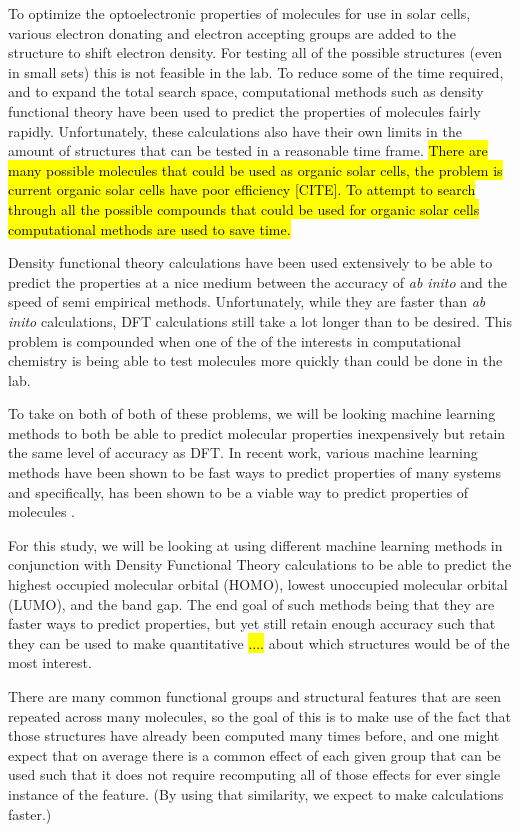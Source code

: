 \documentclass[10pt]{article}
\begin{document}
To optimize the optoelectronic properties of molecules for use in solar cells, various electron donating and electron accepting groups are added to the structure to shift electron density. For testing all of the possible structures (even in small sets) this is not feasible in the lab. To reduce some of the time required, and to expand the total search space, computational methods such as density functional theory have been used to predict the properties of molecules fairly rapidly. Unfortunately, these calculations also have their own limits in the amount of structures that can be tested in a reasonable time frame.
 \hl{There are many possible molecules that could be used as organic solar cells, the problem is current organic solar cells have poor efficiency [CITE]. To attempt to search through all the possible compounds that could be used for organic solar cells computational methods are used to save time.}

Density functional theory calculations have been used extensively to be able to predict the properties at a nice medium between the accuracy of \emph{ab inito} and the speed of semi empirical methods. Unfortunately, while they are faster than \emph{ab inito} calculations, DFT calculations still take a lot longer than to be desired. This problem is compounded when one of the of the interests in computational chemistry is being able to test molecules more quickly than could be done in the lab.

To take on both of both of these problems, we will be looking machine learning methods to both be able to predict molecular properties inexpensively but retain the same level of accuracy as DFT. In recent work, various machine learning methods have been shown to be fast ways to predict properties of many systems and specifically, has been shown to be a viable way to predict properties of molecules\cite{hansen_assessment_2013} \cite{montavon_machine_2013}.

For this study, we will be looking at using different machine learning methods in conjunction with Density Functional Theory calculations to be able to predict the highest occupied molecular orbital (HOMO), lowest unoccupied molecular orbital (LUMO), and the band gap. The end goal of such methods being that they are faster ways to predict properties, but yet still retain enough accuracy such that they can be used to make quantitative \hl{....} about which structures would be of the most interest.

There are many common functional groups and structural features that are seen repeated across many molecules, so the goal of this is to make use of the fact that those structures have already been computed many times before, and one might expect that on average there is a common effect of each given group that can be used such that it does not require recomputing all of those effects for ever single instance of the feature. (By using that similarity, we expect to make calculations faster.)
\end{document}

